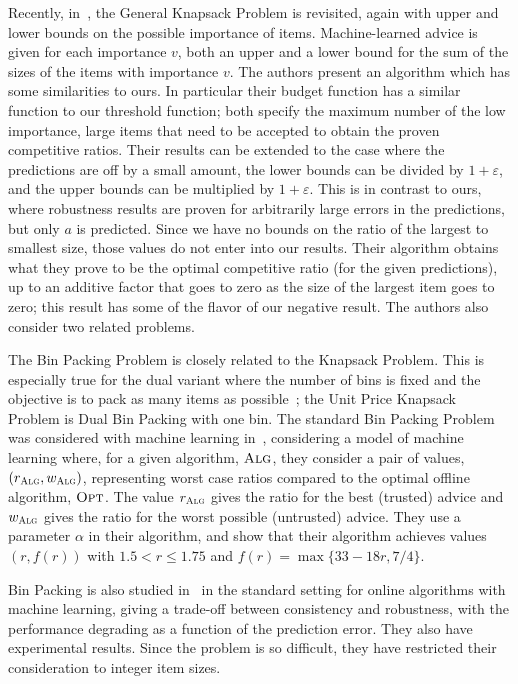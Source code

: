 \documentclass[a4paper,UKenglish,cleveref, autoref, thm-restate]{lipics-v2021}
\newcommand{\ALG}{\ensuremath{\operatorname{\textsc{Alg}}}\xspace}
\newcommand{\OPT}{\ensuremath{\operatorname{\textsc{Opt}}}\xspace}
\newcommand{\eps}{\ensuremath{\varepsilon}}
\begin{document}
Recently, in~\cite{IKQP21knapsack}, the General Knapsack Problem is
revisited, again with upper and lower bounds on the possible importance of items.
Machine-learned advice is given for each importance $v$, both an upper and
a lower bound for the sum of the sizes of the items with importance $v$.
The authors present an algorithm which has some similarities to ours.
In particular their budget function has a similar function to our
threshold function; both specify the maximum number of the low importance,
large items that need to be accepted to obtain the proven competitive
ratios. Their results can be extended to the case where the
predictions are off by a small amount, the lower bounds can be divided
by $1+\eps$, and the upper bounds can be multiplied by
$1+\eps$. This is in contrast to ours, where robustness results
are proven for arbitrarily large errors in the predictions, but only
$a$ is predicted. Since we have no bounds on the ratio of
the largest to smallest size, those values do not enter into our
results.  Their algorithm obtains what they prove to be the optimal
competitive ratio (for the given predictions), up to an additive
factor that goes to zero as the size of the largest item goes to zero;
this result has some of the flavor of our negative result.
The authors also consider two related problems.

The Bin Packing Problem is closely related to the Knapsack
Problem. This is
especially true for the dual variant where the number of bins is fixed
and the objective is to pack as many items as possible~\cite{BFLN01};
 the Unit Price Knapsack Problem is Dual Bin Packing
with one bin.
The standard Bin Packing Problem was considered with machine learning
in~\cite{ADJKR20}, considering a model of machine learning where, for
a given algorithm, \ALG, they consider a pair of values,
$(r_{\ALG},w_{\ALG})$, representing worst case ratios compared to the
optimal offline algorithm, \OPT. The value $r_{\ALG}$ gives the ratio
for the best (trusted) advice and $w_{\ALG}$ gives the ratio for the
worst possible (untrusted) advice. They use a parameter $\alpha$ in
their algorithm, and show that their algorithm achieves values
$(r, f(r))$ with $1.5<r \leq 1.75$ and $f(r)=\max\{33-18r,7/4\}$.

Bin Packing is also studied in~\cite{AKS21} in the standard setting
for online algorithms with machine learning, giving a trade-off
between consistency and robustness, with the performance degrading as
a function of the prediction error. They also have experimental
results. Since the problem is so difficult, they have restricted their
consideration to integer item sizes.
\end{document}
